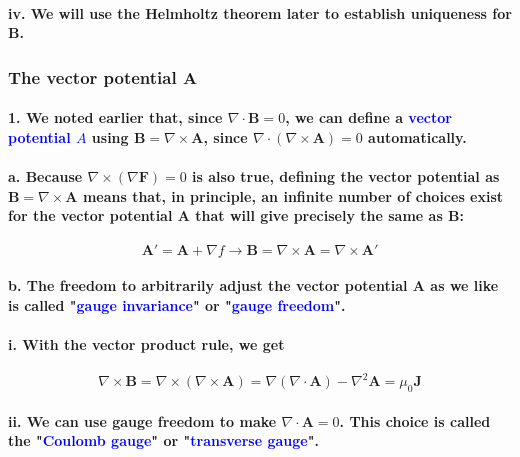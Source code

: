 \documentclass{article}
\begin{document}
\paragraph{\indent\indent iv. We will use the Helmholtz theorem later to establish uniqueness for $\boldsymbol{B}$.}
\subsubsection{The vector potential $\boldsymbol{A}$}
\paragraph{1. We noted earlier that, since $\nabla\cdot\boldsymbol{B}=0$, we can define a \textcolor{blue}{vector potential $A$} using $\boldsymbol{B}=\nabla\times\boldsymbol{A}$, since $\nabla\cdot(\nabla\times\boldsymbol{A})=0$ automatically.}
\paragraph{\indent a. Because $\nabla\times(\nabla\boldsymbol{F})=0$ is also true, defining the vector potential as $\boldsymbol{B}=\nabla\times\boldsymbol{A}$ means that, in principle, an infinite number of choices exist for the vector potential $\boldsymbol{A}$ that will give precisely the same as $\boldsymbol{B}$:}
\begin{equation*}
    \boldsymbol{A'}=\boldsymbol{A}+\nabla f\rightarrow \boldsymbol{B}=\nabla\times\boldsymbol{A}=\nabla\times\boldsymbol{A'}
\end{equation*}
\paragraph{\indent b. The freedom to arbitrarily adjust the vector potential $\boldsymbol{A}$ as we like is called "\textcolor{blue}{gauge invariance}" or "\textcolor{blue}{gauge freedom}".}
\paragraph{\indent\indent i. With the vector product rule, we get}
\begin{equation*}
    \nabla\times\boldsymbol{B}=\nabla\times(\nabla\times\boldsymbol{A})=\nabla(\nabla\cdot\boldsymbol{A})-\nabla^2\boldsymbol{A}=\mu_0\boldsymbol{J}
\end{equation*}
\paragraph{\indent\indent ii. We can use gauge freedom to make $\nabla\cdot\boldsymbol{A}=0$. This choice is called the "\textcolor{blue}{Coulomb gauge}" or "\textcolor{blue}{transverse gauge}".}
\end{document}
